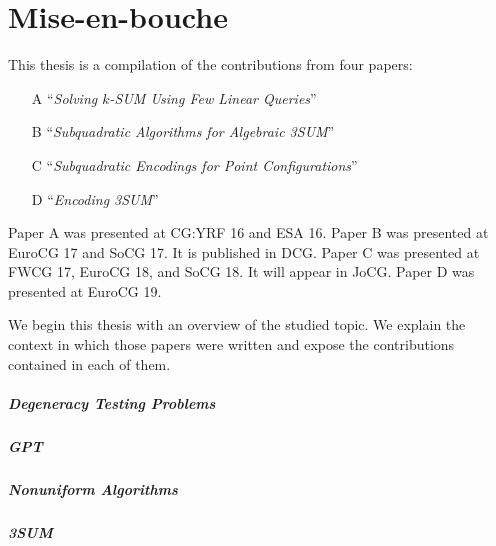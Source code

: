 \chapter{Mise-en-bouche}




This thesis is a compilation of the contributions from four papers:
%
\begin{enumerate}
	\item[A] ``\emph{Solving \(k\)-SUM Using Few Linear Queries}''~\cite{CIO16}
	\item[B] ``\emph{Subquadratic Algorithms for Algebraic 3SUM}''~\cite{BCILOS19}
	\item[C] ``\emph{Subquadratic Encodings for Point Configurations}''~\cite{CCILO19}
	\item[D] ``\emph{Encoding 3SUM}''~\cite{CCILMO19}
\end{enumerate}
%
Paper A was presented at CG:YRF 16 and ESA 16.
%
Paper B was presented at EuroCG 17 and SoCG 17. It is published in DCG.
%
Paper C was presented at FWCG 17, EuroCG 18, and SoCG 18. It will appear in JoCG.
%
Paper D was presented at EuroCG 19.

We begin this thesis with an overview of the studied topic.
%
We explain the context in which those papers were written and expose
the contributions contained in each of them.

\paragraph{Degeneracy Testing Problems}


\paragraph{GPT}


\paragraph{Nonuniform Algorithms}


\paragraph{3SUM}


